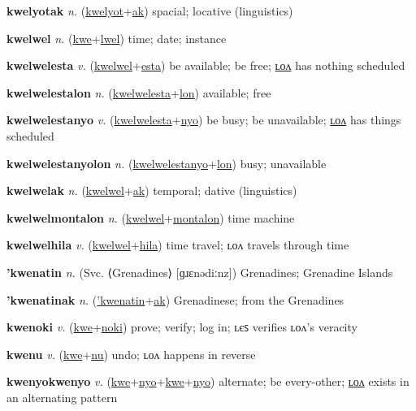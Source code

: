 \textbf{\hypertarget{kwelyotak}{kwelyotak}} \textit{n.} (\hyperlink{kwelyot}{kwelyot}+\allowbreak \hyperlink{ak}{ak})
spacial; locative (linguistics)

\textbf{\hypertarget{kwelwel}{kwelwel}} \textit{n.} (\hyperlink{kwe}{kwe}+\allowbreak \hyperlink{lwel}{lwel})
time; date; instance

\textbf{\hypertarget{kwelwelesta}{kwelwelesta}} \textit{v.} (\hyperlink{kwelwel}{kwelwel}+\allowbreak \hyperlink{esta}{esta})
be available; be free; \hyperlink{kwelwelestalon}{ʟᴏᴧ} has nothing scheduled

\textbf{\hypertarget{kwelwelestalon}{kwelwelestalon}} \textit{n.} (\hyperlink{kwelwelesta}{kwelwelesta}+\allowbreak \hyperlink{lon}{lon})
available; free

\textbf{\hypertarget{kwelwelestanyo}{kwelwelestanyo}} \textit{v.} (\hyperlink{kwelwelesta}{kwelwelesta}+\allowbreak \hyperlink{nyo}{nyo})
be busy; be unavailable; \hyperlink{kwelwelestanyolon}{ʟᴏᴧ} has things scheduled

\textbf{\hypertarget{kwelwelestanyolon}{kwelwelestanyolon}} \textit{n.} (\hyperlink{kwelwelestanyo}{kwelwelestanyo}+\allowbreak \hyperlink{lon}{lon})
busy; unavailable

\textbf{\hypertarget{kwelwelak}{kwelwelak}} \textit{n.} (\hyperlink{kwelwel}{kwelwel}+\allowbreak \hyperlink{ak}{ak})
temporal; dative (linguistics)

\textbf{\hypertarget{kwelwelmontalon}{kwelwelmontalon}} \textit{n.} (\hyperlink{kwelwel}{kwelwel}+\allowbreak \hyperlink{montalon}{montalon})
time machine

\textbf{\hypertarget{kwelwelhila}{kwelwelhila}} \textit{v.} (\hyperlink{kwelwel}{kwelwel}+\allowbreak \hyperlink{hila}{hila})
time travel; ʟᴏᴧ travels through time

\textbf{\hypertarget{'kwenatin}{'kwenatin}} \textit{n.} (Svc. ⟨Grenadines⟩ [ɡɹɛnədiːnz])
Grenadines; Grenadine Islands

\textbf{\hypertarget{'kwenatinak}{'kwenatinak}} \textit{n.} (\hyperlink{'kwenatin}{'kwenatin}+\allowbreak \hyperlink{ak}{ak})
Grenadinese; from the Grenadines

\textbf{\hypertarget{kwenoki}{kwenoki}} \textit{v.} (\hyperlink{kwe}{kwe}+\allowbreak \hyperlink{noki}{noki})
prove; verify; log in; ʟєꜱ verifies ʟᴏᴧ’s veracity

\textbf{\hypertarget{kwenu}{kwenu}} \textit{v.} (\hyperlink{kwe}{kwe}+\allowbreak \hyperlink{nu}{nu})
undo; ʟᴏᴧ happens in reverse

\textbf{\hypertarget{kwenyokwenyo}{kwenyokwenyo}} \textit{v.} (\hyperlink{kwe}{kwe}+\allowbreak \hyperlink{nyo}{nyo}+\allowbreak \hyperlink{kwe}{kwe}+\allowbreak \hyperlink{nyo}{nyo})
alternate; be every-other; \hyperlink{kwenyokwenyolon}{ʟᴏᴧ} exists in an alternating pattern

